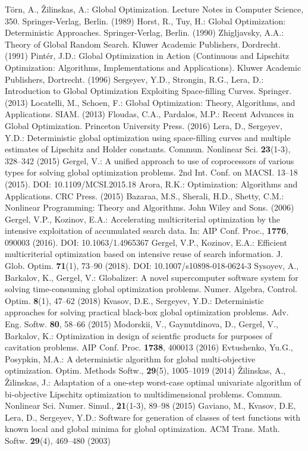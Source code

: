 \documentclass[smallextended]{svjour3}       %
\begin{document}
\begin{thebibliography}{}
 T\"orn, A., {\v Z}ilinskas, A.: Global Optimization. Lecture Notes in Computer Science, 350. Springer-Verlag, Berlin. (1989)
 Horst, R., Tuy, H.: Global Optimization: Deterministic Approaches. Springer-Verlag, Berlin. (1990)
 Zhigljavsky, A.A.: Theory of Global Random Search. Kluwer Academic Publishers, Dordrecht. (1991)
 Pint\'er, J.D.: Global Optimization in Action (Continuous and Lipschitz Optimization: Algorithms, Implementations and Applications). Kluwer Academic Publishers, Dortrecht. (1996)
 Sergeyev, Y.D., Strongin, R.G., Lera, D.: Introduction to Global Optimization Exploiting Space-filling Curves. Springer. (2013)
 Locatelli, M., Schoen, F.: Global Optimization: Theory, Algorithms, and Applications. SIAM. (2013)
 Floudas, C.A., Pardalos, M.P.: Recent Advances in Global Optimization. Princeton University Press. (2016)
 Lera, D., Sergeyev, Y.D.: Deterministic global optimization using space-filling curves and multiple estimates of Lipschitz and Holder constants. Commun. Nonlinear Sci. \textbf{23}(1-3), 328--342 (2015)
 Gergel, V.: A unified approach to use of coprocessors of various types for solving global optimization problems. 2nd Int. Conf. on MACSI. 13--18 (2015). DOI: 10.1109/MCSI.2015.18
 Arora, R.K.: Optimization: Algorithms and Applications. CRC Press. (2015)
 Bazaraa, M.S., Sherali, H.D., Shetty, C.M.: Nonlinear Programming: Theory and Algorithms. John Wiley and Sons. (2006)
 Gergel, V.P., Kozinov, E.A.: Accelerating multicriterial optimization by the intensive exploitation of accumulated search data. In: 	AIP Conf. Proc., \textbf{1776}, 090003 (2016). DOI: 10.1063/1.4965367
 Gergel, V.P., Kozinov, E.A.: Efficient multicriterial optimization based on intensive reuse of search information.  J. Glob. Optim. \textbf{71}(1), 73--90 (2018). DOI: 10.1007/s10898-018-0624-3
 Sysoyev, A., Barkalov, K., Gergel, V.: Globalizer: A novel supercomputer software system for solving time-consuming global optimization problems. Numer. Algebra, Control. Optim. \textbf{8}(1), 47--62 (2018)
 Kvasov, D.E., Sergeyev, Y.D.: Deterministic approaches for solving practical black-box global optimization problems. Adv. Eng. Softw. \textbf{80}, 58--66 (2015)
 Modorskii, V., Gaynutdinova, D., Gergel, V., Barkalov, K.: Optimization in design of scientfic products for purposes of cavitation problems. AIP Conf. Proc. \textbf{1738}, 400013 (2016)
 Evtushenko, Yu.G., Posypkin, M.A.: A deterministic algorithm for global multi-objective optimization. Optim. Methods Softw., \textbf{29}(5), 1005--1019 (2014)
 {\v Z}ilinskas, A., {\v Z}ilinskas, J.: Adaptation of a one-step worst-case optimal univariate algorithm of bi-objective Lipschitz optimization to multidimensional problems. Commun. Nonlinear Sci. Numer. Simul., \textbf{21}(1-3), 89--98 (2015)
 Gaviano, M., Kvasov, D.E, Lera, D., Sergeyev, Y.D.: Software for generation of classes of test functions with known local and global minima for global optimization. ACM Trans. Math. Softw. \textbf{29}(4), 469--480 (2003)



\end{thebibliography}
\end{document}
